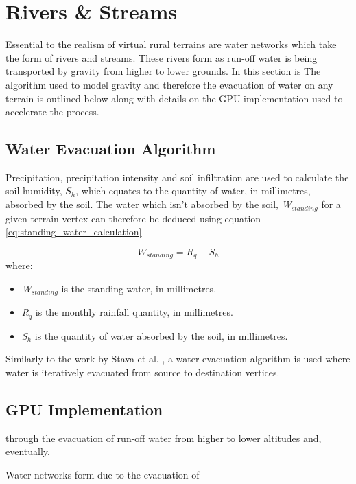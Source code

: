 \section{Rivers \& Streams}

Essential to the realism of virtual rural terrains are water networks which take the form of rivers and streams. These rivers form as run-off water is being transported by gravity from higher to lower grounds. In this section is  The algorithm used to model gravity and therefore the evacuation of water on any terrain is outlined below along with details on the GPU implementation used to accelerate the process.

\subsection{Water Evacuation Algorithm} 

Precipitation, precipitation intensity and soil infiltration are used to calculate the soil humidity, $S_{h}$, which equates to the quantity of water, in millimetres, absorbed by the soil. The water which isn't absorbed by the soil, \textit{W$_{standing}$} for a given terrain vertex can therefore be deduced using equation \ref{eq:standing_water_calculation}

\begin{equation} \label{eq:standing_water_calculation}
	W_{standing} = R_{q} - S_{h}
\end{equation}
where:
\begin{itemize}
\item \textit{W$_{standing}$} is the standing water, in millimetres.\\
\item \textit{R$_{q}$} is the monthly rainfall quantity, in millimetres.\\
\item \textit{S$_{h}$} is the quantity of water absorbed by the soil, in millimetres.\\
\end{itemize}

Similarly to the work by Stava et al. \cite{StAva2008}, a water evacuation algorithm is used where water is iteratively evacuated from source to destination vertices.

\subsection{GPU Implementation}

through the evacuation of run-off water from higher to lower altitudes and, eventually, 

Water networks form due to the evacuation of 
